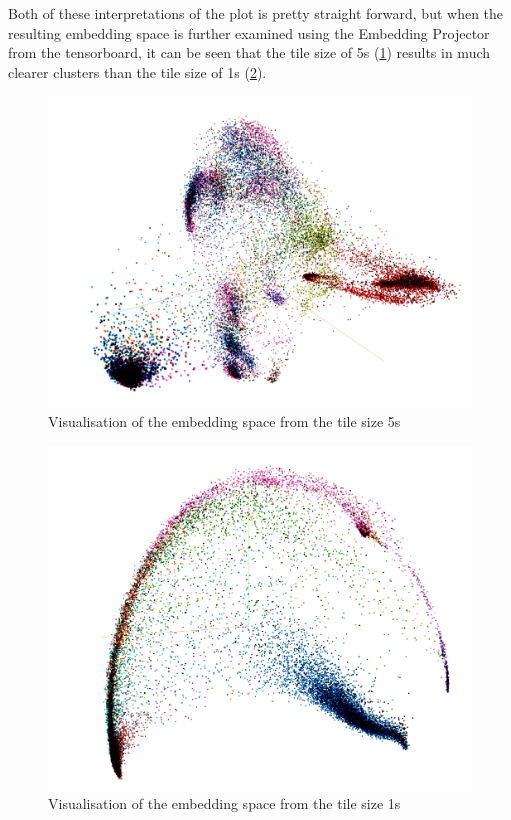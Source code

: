 \documentclass[twocolumn]{article}
\begin{document}
Both of these interpretations of the plot is pretty straight forward, but when the resulting embedding space is further examined using the Embedding Projector from the tensorboard, it can be seen that the tile size of 5s (\ref{fig:embedding-5s}) results in much clearer clusters than the tile size of 1s (\ref{fig:embedding-1s}). 

\begin{figure}[t]
\centering
    \includegraphics[width=\linewidth]{assets/embedding_space_5s.png}
    \caption{Visualisation of the embedding space from the tile size 5s}
    \label{fig:embedding-5s}
\end{figure}

\begin{figure}[t]
\centering
    \includegraphics[width=\linewidth]{assets/embedding_space_1s.png}
    \caption{Visualisation of the embedding space from the tile size 1s}
    \label{fig:embedding-1s}
\end{figure}
\end{document}
